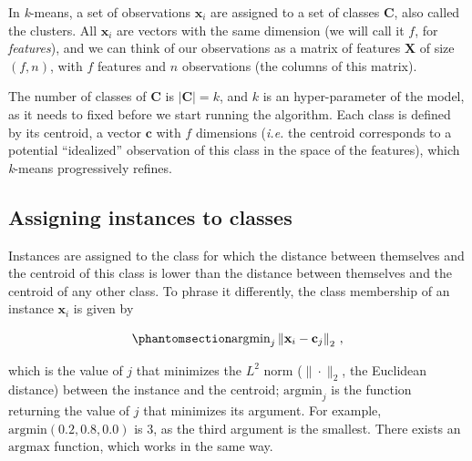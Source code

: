\documentclass[
  letterpaper,
]{scrbook}
\begin{document}
In \emph{k}-means, a set of observations \(\mathbf{x}_i\) are assigned
to a set of classes \(\mathbf{C}\), also called the clusters. All
\(\mathbf{x}_i\) are vectors with the same dimension (we will call it
\(f\), for \emph{features}), and we can think of our observations as a
matrix of features \(\mathbf{X}\) of size \((f, n)\), with \(f\)
features and \(n\) observations (the columns of this matrix).

The number of classes of \(\mathbf{C}\) is \(|\mathbf{C}| = k\), and
\(k\) is an hyper-parameter of the model, as it needs to fixed before we
start running the algorithm. Each class is defined by its centroid, a
vector \(\mathbf{c}\) with \(f\) dimensions (\emph{i.e.} the centroid
corresponds to a potential ``idealized'' observation of this class in
the space of the features), which \emph{k}-means progressively refines.

\subsection{Assigning instances to
classes}\label{assigning-instances-to-classes}


Instances are assigned to the class for which the distance between
themselves and the centroid of this class is lower than the distance
between themselves and the centroid of any other class. To phrase it
differently, the class membership of an instance \(\mathbf{x}_i\) is
given by

\begin{equation}\phantomsection\label{eq-clustering-onepoint}{
\text{argmin}_j \left\|\mathbf{x}_i-\mathbf{c}_j\right\|_2 \,,
}\end{equation}

which is the value of \(j\) that minimizes the \(L^2\) norm
(\(\|\cdot\|_2\), the Euclidean distance) between the instance and the
centroid; \(\text{argmin}_j\) is the function returning the value of
\(j\) that minimizes its argument. For example,
\(\text{argmin}(0.2,0.8,0.0)\) is \(3\), as the third argument is the
smallest. There exists an \(\text{argmax}\) function, which works in the
same way.
\end{document}
